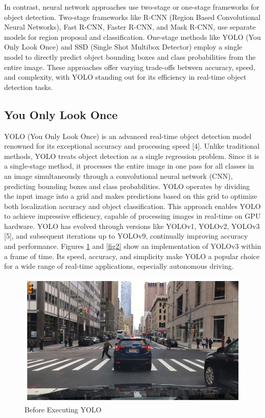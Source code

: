 \documentclass[conference]{IEEEtran}
\begin{document}
In contrast, neural network approaches use two-stage or one-stage frameworks for object detection. 
Two-stage frameworks like R-CNN (Region Based Convolutional Neural Networks), Fast R-CNN, Faster 
R-CNN, and Mask R-CNN, use separate models for region proposal and classification. One-stage methods like YOLO (You Only Look Once) and SSD (Single Shot Multibox Detector) employ a 
single model to directly predict object bounding boxes and class probabilities from the entire image. 
These approaches offer varying trade-offs between accuracy, speed, and complexity, with YOLO standing 
out for its efficiency in real-time object detection tasks.

\subsection{You Only Look Once}
YOLO (You Only Look Once) is an advanced real-time object detection model renowned for its 
exceptional accuracy and processing speed [4]. Unlike traditional methods, YOLO treats object 
detection as a single regression problem. Since it is a single-stage method, it processes the 
entire image in one pass for all classes in an image simultaneously through a convolutional 
neural network (CNN), predicting bounding boxes and class probabilities. YOLO 
operates by dividing the input image into a grid and makes predictions based on this grid 
to optimize both localization accuracy and object classification. This approach enables YOLO to 
achieve impressive efficiency, capable of processing images in real-time on GPU hardware. YOLO 
has evolved through versions like YOLOv1, YOLOv2, YOLOv3 [5], and subsequent iterations up to YOLOv9, 
continually improving accuracy and performance. Figures \ref{fig1} and \ref{fig2} show an implementation of YOLOv3 within 
a frame of time. Its speed, accuracy, and simplicity make YOLO a popular choice for a wide range 
of real-time applications, especially autonomous driving.
\begin{figure}[htbp]
\centerline{\includegraphics[scale=.4]{images/Figure 1.png}}
\caption{Before Executing YOLO}
\label{fig1}
\end{figure}
\end{document}
